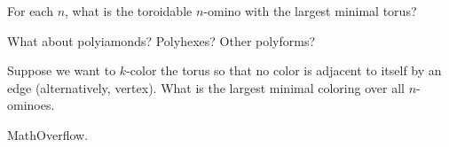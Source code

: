 \documentclass{article}
\begin{document}
\begin{question}
  For each $n$, what is the toroidable $n$-omino with the largest minimal torus?
\end{question}

\begin{related}
  \item What about polyiamonds? Polyhexes? Other polyforms?
  \item Suppose we want to $k$-color the torus so that no color is adjacent to itself by an edge (alternatively, vertex). What is the largest minimal coloring over all $n$-ominoes.
\end{related}

\begin{references}
  \item MathOverflow.
\end{references}
\end{document}
